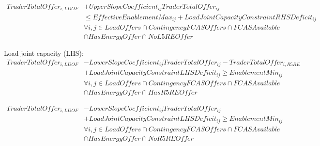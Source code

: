 \documentclass{article}
\begin{document}
\begin{equation}
\begin{split}
TraderTotalOffer_{i,LDOF} & + UpperSlopeCoefficient_{ij} TraderTotalOffer_{ij} \\
& \leq EffectiveEnablementMax_{ij} + LoadJointCapacityConstraintRHSDeficit_{ij} \\
& \forall i,j \in LoadOffers \cap ContingencyFCASOffers \cap FCASAvailable \\
& \cap HasEnergyOffer \cap NoL5REOffer
\end{split}
\end{equation}

%
%
%
%
%

Load joint capacity (LHS):
\begin{equation}
\begin{split}
TraderTotalOffer_{i,LDOF} & - LowerSlopeCoefficient_{ij} TraderTotalOffer_{ij} - TraderTotalOffer_{i,R5RE} \\
& + LoadJointCapacityConstraintLHSDeficit_{ij} \geq EnablementMin_{ij} \\
& \forall i,j \in LoadOffers \cap ContingencyFCASOffers \cap FCASAvailable \\
& \cap HasEnergyOffer \cap HasR5REOffer
\end{split}
\end{equation}

\begin{equation}
\begin{split}
TraderTotalOffer_{i,LDOF} & - LowerSlopeCoefficient_{ij} TraderTotalOffer_{ij} \\
& + LoadJointCapacityConstraintLHSDeficit_{ij} \geq EnablementMin_{ij} \\
& \forall i,j \in LoadOffers \cap ContingencyFCASOffers \cap FCASAvailable \\
& \cap HasEnergyOffer \cap NoR5REOffer
\end{split}
\end{equation}
\end{document}
